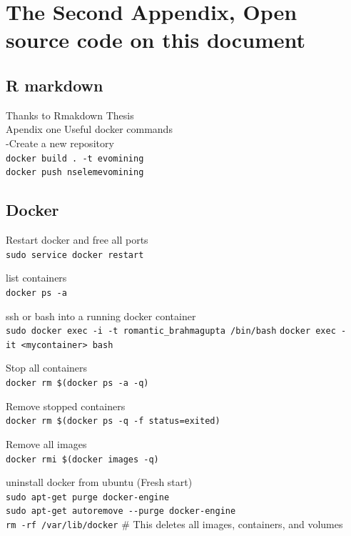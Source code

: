 \documentclass[12pt,twoside]{reedthesis}
\begin{document}
  \chapter{The Second Appendix, Open source code on this
  document}\label{the-second-appendix-open-source-code-on-this-document}
  
  \section{R markdown}\label{r-markdown}
  
  Thanks to Rmakdown Thesis\\
  Apendix one Useful docker commands\\
  -Create a new repository\\
  \texttt{docker\ build\ .\ -t\ evomining}\\
  \texttt{docker\ push\ nselemevomining}
  
  \section{Docker}\label{docker}
  
  Restart docker and free all ports\\
  \texttt{sudo\ service\ docker\ restart}
  
  list containers\\
  \texttt{docker\ ps\ -a}
  
  ssh or bash into a running docker container\\
  \texttt{sudo\ docker\ exec\ -i\ -t\ romantic\_brahmagupta\ /bin/bash}
  \texttt{docker\ exec\ -it\ \textless{}mycontainer\textgreater{}\ bash}
  
  Stop all containers\\
  \texttt{docker\ rm\ \$(docker\ ps\ -a\ -q)}
  
  Remove stopped containers\\
  \texttt{docker\ rm\ \$(docker\ ps\ -q\ -f\ status=exited)}
  
  Remove all images\\
  \texttt{docker\ rmi\ \$(docker\ images\ -q)}
  
  uninstall docker from ubuntu (Fresh start)\\
  \texttt{sudo\ apt-get\ purge\ docker-engine}\\
  \texttt{sudo\ apt-get\ autoremove\ -\/-purge\ docker-engine}\\
  \texttt{rm\ -rf\ /var/lib/docker} \# This deletes all images,
  containers, and volumes
  
\end{document}

